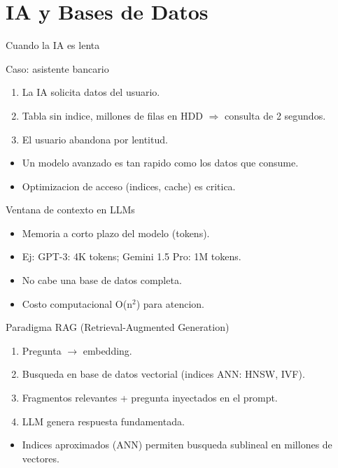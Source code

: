 \documentclass[aspectratio=169, 10pt, xcolor=table]{beamer}
\begin{document}
\section{IA y Bases de Datos}

\begin{frame}{Cuando la IA es lenta}
    \begin{exampleblock}{Caso: asistente bancario}
        \begin{enumerate}
            \item La IA solicita datos del usuario.
            \item Tabla sin indice, millones de filas en HDD $\Rightarrow$ consulta de 2 segundos.
            \item El usuario abandona por lentitud.
        \end{enumerate}
    \end{exampleblock}
    \begin{itemize}
        \item Un modelo avanzado es tan rapido como los datos que consume.
        \item Optimizacion de acceso (indices, cache) es critica.
    \end{itemize}
\end{frame}

\begin{frame}{Ventana de contexto en LLMs}
    \begin{itemize}
        \item Memoria a corto plazo del modelo (tokens).
        \item Ej: GPT-3: 4K tokens; Gemini 1.5 Pro: 1M tokens.
        \item No cabe una base de datos completa.
        \item Costo computacional O(n$^2$) para atencion.
    \end{itemize}
\end{frame}

\begin{frame}{Paradigma RAG (Retrieval-Augmented Generation)}
    \begin{enumerate}
        \item Pregunta $\rightarrow$ embedding.
        \item Busqueda en base de datos vectorial (indices ANN: HNSW, IVF).
        \item Fragmentos relevantes + pregunta inyectados en el prompt.
        \item LLM genera respuesta fundamentada.
    \end{enumerate}
    \begin{itemize}
        \item Indices aproximados (ANN) permiten busqueda sublineal en millones de vectores.
    \end{itemize}
\end{frame}
\end{document}
